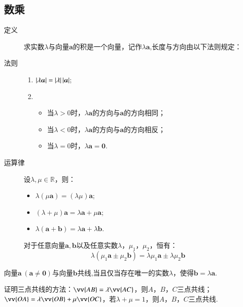   \subsection{数乘}
    \begin{description}
      \item[定义] 求实数$ \lambda $与向量$\bm{a}$的积是一个向量，记作$\lambda\bm{a}$,长度与方向由以下法则规定：
      \item[法则]
        \begin{enumerate}[label=\arabic*)]
          \item $\left| \lambda \bm{a} \right|=\left| \lambda \right|\left| \bm{a} \right| $;
          \item
            \begin{itemize}
              \item 当$ \lambda>0 $时，$ \lambda\bm{a} $的方向与$\bm{a}$的方向相同；
              \item 当$ \lambda<0 $时，$ \lambda\bm{a} $的方向与$\bm{a}$的方向相反；
              \item 当$ \lambda=0 $时，$ \lambda\bm{a}=\bm 0 $.
            \end{itemize}
        \end{enumerate}
      \item[运算律]
        设$\lambda,\mu\in\mathbb{R}$，则：\par
        \begin{itemize}
            \item $\lambda(\mu\bm{a})=(\lambda\mu)\bm{a}$;
            \item $(\lambda+\mu)\bm{a}=\lambda\bm{a}+\mu\bm{a}$;
            \item $\lambda(\bm{a}+\bm{b})=\lambda\bm{a}+\lambda\bm{b}$.
        \end{itemize}
      对于任意向量$\bm a,\bm b$以及任意实数$\lambda$，$\mu_1$，$\mu_2$，恒有：
      \[\lambda({\mu_1\bm a}\pm{\mu_2\bm b})={\lambda\mu_1\bm a}\pm{\lambda\mu_2\bm b}\]
    \end{description}
    \begin{Theorem}[向量共线定理]
      向量$\bm{a}~(\bm{a}\ne\bm{0})$与向量$\bm{b}$共线,当且仅当存在唯一的实数$ \lambda $，使得$\bm{b}=\lambda\bm{a}$.
    \end{Theorem}
    {\kaishu
     证明三点共线的方法：$\vv{AB}=\lambda\vv{AC}$，则$A$，$B$，$C$三点共线；$\vv{OA}=\lambda\vv{OB}+\mu\vv{OC}$，若$\lambda+\mu=1$，则$A$，$B$，$C$三点共线.
    }
